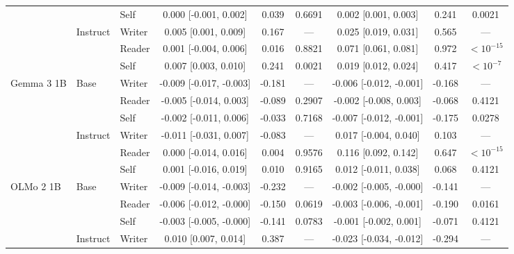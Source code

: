 \begin{table}[htbp]
\begin{tabular}{lll ccc ccc}
                       &                      & Self       & 0.000 [-0.001, 0.002] & 0.039 & 0.6691 & 0.002 [0.001, 0.003] & 0.241 & 0.0021 \\
\cmidrule(lr){2-9}
                       & \multirow{3}{*}{Instruct} & Writer     & 0.005 [0.001, 0.009] & 0.167 & --- & 0.025 [0.019, 0.031] & 0.565 & --- \\
                       &                      & Reader     & 0.001 [-0.004, 0.006] & 0.016 & 0.8821 & 0.071 [0.061, 0.081] & 0.972 & $<10^{-15}$ \\
                       &                      & Self       & 0.007 [0.003, 0.010] & 0.241 & 0.0021 & 0.019 [0.012, 0.024] & 0.417 & $<10^{-7}$ \\
\midrule
\multirow{6}{*}{Gemma 3 1B} & \multirow{3}{*}{Base} & Writer     & -0.009 [-0.017, -0.003] & -0.181 & --- & -0.006 [-0.012, -0.001] & -0.168 & --- \\
                       &                      & Reader     & -0.005 [-0.014, 0.003] & -0.089 & 0.2907 & -0.002 [-0.008, 0.003] & -0.068 & 0.4121 \\
                       &                      & Self       & -0.002 [-0.011, 0.006] & -0.033 & 0.7168 & -0.007 [-0.012, -0.001] & -0.175 & 0.0278 \\
\cmidrule(lr){2-9}
                       & \multirow{3}{*}{Instruct} & Writer     & -0.011 [-0.031, 0.007] & -0.083 & --- & 0.017 [-0.004, 0.040] & 0.103 & --- \\
                       &                      & Reader     & 0.000 [-0.014, 0.016] & 0.004 & 0.9576 & 0.116 [0.092, 0.142] & 0.647 & $<10^{-15}$ \\
                       &                      & Self       & 0.001 [-0.016, 0.019] & 0.010 & 0.9165 & 0.012 [-0.011, 0.038] & 0.068 & 0.4121 \\
\midrule
\multirow{6}{*}{OLMo 2 1B} & \multirow{3}{*}{Base} & Writer     & -0.009 [-0.014, -0.003] & -0.232 & --- & -0.002 [-0.005, -0.000] & -0.141 & --- \\
                       &                      & Reader     & -0.006 [-0.012, -0.000] & -0.150 & 0.0619 & -0.003 [-0.006, -0.001] & -0.190 & 0.0161 \\
                       &                      & Self       & -0.003 [-0.005, -0.000] & -0.141 & 0.0783 & -0.001 [-0.002, 0.001] & -0.071 & 0.4121 \\
\cmidrule(lr){2-9}
                       & \multirow{3}{*}{Instruct} & Writer     & 0.010 [0.007, 0.014] & 0.387 & --- & -0.023 [-0.034, -0.012] & -0.294 & --- \\

\end{tabular}
\end{table}
